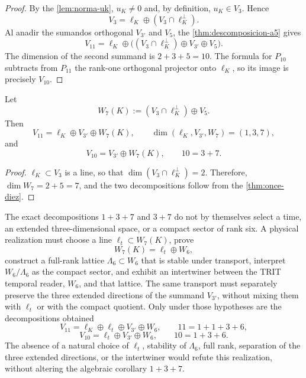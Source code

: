 \begin{proof}
By the \cref{lem:norma-uk}, \(u_K\neq0\) and, by definition, \(u_K\in V_3\).
Hence
\[
V_3=\ell_K\oplus(V_3\cap\ell_K^\perp).
\]
Al anadir the sumandos orthogonal \(V_{3'}\) and \(V_5\), the
\cref{thm:descomposicion-a5} gives
\[
V_{11}=\ell_K\oplus
\bigl((V_3\cap\ell_K^\perp)\oplus V_{3'}\oplus V_5\bigr).
\]
The dimension of the second summand is \(2+3+5=10\). The formula for
\(P_{10}\) subtracts from \(P_{11}\) the rank-one orthogonal projector
onto \(\ell_K\), so its image is precisely \(V_{10}\).
\end{proof}

\begin{corollary}
\label{cor:descomposicion-1-3-7}
Let
\[
W_7(K):=(V_3\cap\ell_K^\perp)\oplus V_5.
\]
Then
\[
\boxed{
V_{11}=\ell_K\oplus V_{3'}\oplus W_7(K),
\qquad
\dim(\ell_K,V_{3'},W_7)=(1,3,7),}
\]
and
\[
\boxed{
V_{10}=V_{3'}\oplus W_7(K),
\qquad 10=3+7.}
\]
\end{corollary}

\begin{proof}
\(\ell_K\subset V_3\) is a line, so that
\(\dim(V_3\cap\ell_K^\perp)=2\). Therefore,
\(\dim W_7=2+5=7\), and the two decompositions follow from the
\cref{thm:once-diez}.
\end{proof}

\begin{remark}
\label{rem:interfaz-1-3-6}
The exact decompositions \(1+3+7\) and \(3+7\) do not by themselves select
a time, an extended three-dimensional space, or a compact sector of rank
six. A physical realization must choose a line
\(\ell_t\subset W_7(K)\), prove
\[
W_7(K)=\ell_t\oplus W_6,
\]
construct a full-rank lattice
\(\Lambda_6\subset W_6\) that is stable under transport, interpret
\(W_6/\Lambda_6\) as the compact sector, and exhibit an intertwiner between the
TRIT temporal reader, \(W_6\), and that lattice. The same transport must
separately preserve the three extended directions of the summand
\(V_{3'}\), without mixing them with \(\ell_t\) or with the compact quotient. Only
under those hypotheses are the decompositions obtained
\[
\boxed{
V_{11}=\ell_K\oplus\ell_t\oplus V_{3'}\oplus W_6,
\qquad 11=1+1+3+6,}
\]
\[
\boxed{
V_{10}=\ell_t\oplus V_{3'}\oplus W_6,
\qquad 10=1+3+6.}
\]
The absence of a natural choice of \(\ell_t\), stability of
\(\Lambda_6\), full rank, separation of the three extended
directions, or the intertwiner would refute this realization, without altering the
algebraic corollary \(1+3+7\).
\end{remark}

